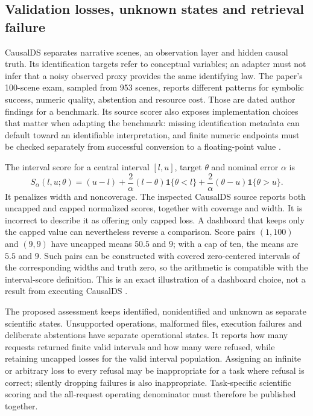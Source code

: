 \subsection{Validation losses, unknown states and retrieval failure}

CausalDS separates narrative scenes, an observation layer and hidden causal
truth. Its identification targets refer to conceptual variables; an adapter must
not infer that a noisy observed proxy provides the same identifying law. The
paper's 100-scene exam, sampled from 953 scenes, reports different patterns for
symbolic success, numeric quality, abstention and resource cost. Those are dated
author findings for a benchmark. Its source scorer also exposes implementation
choices that matter when adapting the benchmark: missing identification metadata
can default toward an identifiable interpretation, and finite numeric endpoints
must be checked separately from successful conversion to a floating-point value
\citep{v12_la_2607_08093,exec14_estimation_sources}.

The interval score for a central interval $[l,u]$, target $\theta$ and nominal
error $\alpha$ is
\[
 S_\alpha(l,u;\theta)=(u-l)+\frac{2}{\alpha}(l-\theta)\mathbf1\{\theta<l\}
                  +\frac{2}{\alpha}(\theta-u)\mathbf1\{\theta>u\}.
\]
It penalizes width and noncoverage. The inspected CausalDS source reports both
uncapped and capped normalized scores, together with coverage and width. It is
incorrect to describe it as offering only capped loss. A dashboard that keeps
only the capped value can nevertheless reverse a comparison. Score pairs
$(1,100)$ and $(9,9)$ have uncapped means $50.5$ and $9$; with a cap of ten,
the means are $5.5$ and $9$. Such pairs can be constructed with covered
zero-centered intervals of the corresponding widths and truth zero, so the
arithmetic is compatible with the interval-score definition. This is an exact
illustration of a dashboard choice, not a result from executing CausalDS
\citep{exec14_estimation_sources,exec14_estimation_oracles}.

The proposed assessment keeps identified, nonidentified and unknown as separate
scientific states. Unsupported operations, malformed files, execution failures
and deliberate abstentions have separate operational states. It reports how
many requests returned finite valid intervals and how many were refused, while
retaining uncapped losses for the valid interval population. Assigning an
infinite or arbitrary loss to every refusal may be inappropriate for a task
where refusal is correct; silently dropping failures is also inappropriate.
Task-specific scientific scoring and the all-request operating denominator
must therefore be published together.


